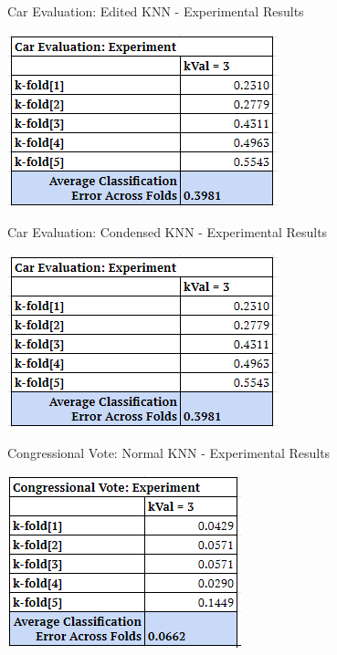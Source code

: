 \documentclass[twoside,11pt]{article}
\begin{document}
\begin{table}[h!]
	\begin{center}
		\caption{Car Evaluation: Edited KNN - Experimental Results}
		\label{tab:table5}
		\includegraphics[scale=.7]{CE_Results_EKNN}\newline
	\end{center}
\end{table}

\begin{table}[h!]
	\begin{center}
		\caption{Car Evaluation: Condensed KNN - Experimental Results}
		\label{tab:table6}
		\includegraphics[scale=.7]{CE_Results_CKNN}\newline
	\end{center}
\end{table}

\begin{table}[h!]
	\begin{center}
		\caption{Congressional Vote: Normal KNN - Experimental Results}
		\label{tab:table7}
		\includegraphics[scale=.7]{CV_Results_NKNN}\newline
	\end{center}
\end{table}
\end{document}
